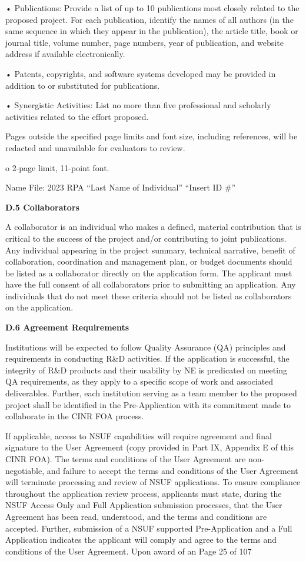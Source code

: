 • Publications: Provide a list of up to 10 publications most closely related to
the proposed project. For each publication, identify the names of all authors
(in the same sequence in which they appear in the publication), the article
title, book or journal title, volume number, page numbers, year of publication,
and website address if available electronically.

• Patents, copyrights, and software systems developed may be provided in
addition to or substituted for publications.

• Synergistic Activities: List no more than five professional and scholarly
activities related to the effort proposed.

Pages outside the specified page limits and font size, including references,
will be redacted and unavailable for evaluators to review.

o 2-page limit, 11-point font.

Name File: 2023 RPA “Last Name of Individual” “Insert ID \#”

{\bf D.5 Collaborators}

A collaborator is an individual who makes a defined, material contribution that
is critical to the success of the project and/or contributing to joint
publications. Any individual appearing in the project summary, technical
narrative, benefit of collaboration, coordination and management plan, or
budget documents should be listed as a collaborator directly on the application
form. The applicant must have the full consent of all collaborators prior to
submitting an application. Any individuals that do not meet these criteria
should not be listed as collaborators on the application.


{\bf D.6 Agreement Requirements}

Institutions will be expected to follow Quality Assurance (QA) principles and
requirements in conducting R\&D activities. If the application is successful,
the integrity of R\&D products and their usability by NE is predicated on
meeting QA requirements, as they apply to a specific scope of work and
associated deliverables. Further, each institution serving as a team member to
the proposed project shall be identified in the Pre-Application with its
commitment made to collaborate in the CINR FOA process.

If applicable, access to NSUF capabilities will require agreement and final
signature to the User Agreement (copy provided in Part IX, Appendix E of this
CINR FOA). The terms and conditions of the User Agreement are non-negotiable,
and failure to accept the terms and conditions of the User Agreement will
terminate processing and review of NSUF applications. To ensure compliance
throughout the application review process, applicants must state, during the
NSUF Access Only and Full Application submission processes, that the User
Agreement has been read, understood, and the terms and conditions are accepted.
Further, submission of a NSUF supported Pre-Application and a Full Application
indicates the applicant will comply and agree to the terms and conditions of
the User Agreement. Upon award of an Page 25 of 107

